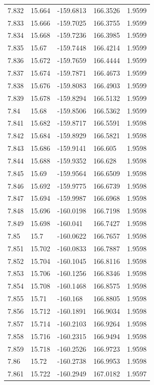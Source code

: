 \begin{tabular}{lllll}
7.832 & 15.664 & -159.6813 & 166.3526 & 1.9599 \\
7.833 & 15.666 & -159.7025 & 166.3755 & 1.9599 \\
7.834 & 15.668 & -159.7236 & 166.3985 & 1.9599 \\
7.835 & 15.67 & -159.7448 & 166.4214 & 1.9599 \\
7.836 & 15.672 & -159.7659 & 166.4444 & 1.9599 \\
7.837 & 15.674 & -159.7871 & 166.4673 & 1.9599 \\
7.838 & 15.676 & -159.8083 & 166.4903 & 1.9599 \\
7.839 & 15.678 & -159.8294 & 166.5132 & 1.9599 \\
7.84 & 15.68 & -159.8506 & 166.5362 & 1.9599 \\
7.841 & 15.682 & -159.8717 & 166.5591 & 1.9598 \\
7.842 & 15.684 & -159.8929 & 166.5821 & 1.9598 \\
7.843 & 15.686 & -159.9141 & 166.605 & 1.9598 \\
7.844 & 15.688 & -159.9352 & 166.628 & 1.9598 \\
7.845 & 15.69 & -159.9564 & 166.6509 & 1.9598 \\
7.846 & 15.692 & -159.9775 & 166.6739 & 1.9598 \\
7.847 & 15.694 & -159.9987 & 166.6968 & 1.9598 \\
7.848 & 15.696 & -160.0198 & 166.7198 & 1.9598 \\
7.849 & 15.698 & -160.041 & 166.7427 & 1.9598 \\
7.85 & 15.7 & -160.0622 & 166.7657 & 1.9598 \\
7.851 & 15.702 & -160.0833 & 166.7887 & 1.9598 \\
7.852 & 15.704 & -160.1045 & 166.8116 & 1.9598 \\
7.853 & 15.706 & -160.1256 & 166.8346 & 1.9598 \\
7.854 & 15.708 & -160.1468 & 166.8575 & 1.9598 \\
7.855 & 15.71 & -160.168 & 166.8805 & 1.9598 \\
7.856 & 15.712 & -160.1891 & 166.9034 & 1.9598 \\
7.857 & 15.714 & -160.2103 & 166.9264 & 1.9598 \\
7.858 & 15.716 & -160.2315 & 166.9494 & 1.9598 \\
7.859 & 15.718 & -160.2526 & 166.9723 & 1.9598 \\
7.86 & 15.72 & -160.2738 & 166.9953 & 1.9598 \\
7.861 & 15.722 & -160.2949 & 167.0182 & 1.9597 \\

\end{tabular}
